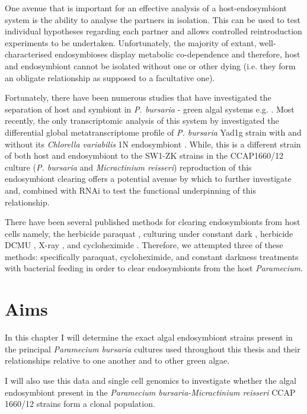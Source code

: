 One avenue that is important for an effective analysis of a host-endosymbiont
system is the ability to analyse the partners in isolation.  This can be used
to test individual hypotheses regarding each partner and  allows controlled
reintroduction experiments to be undertaken. 
Unfortunately,
the majority of extant, well-characterised endosymbioses display metabolic co-dependence
and therefore, host and endosymbiont cannot be isolated without one or other dying (i.e. they
form an obligate relationship as supposed to a facultative one). 

Fortunately, there have been numerous studies that have investigated the separation of 
host and symbiont in \textit{P. bursaria} - green algal systems e.g. \citep{Hosoya1995a,Achilles-Day2013,
Karakashian1963}. Most recently, the only transcriptomic analysis of this system by \citet{Kodama2014c}
investigated the differential global metatranscriptome profile of \textit{P. bursaria} Yad1g strain with 
 and without its \textit{Chlorella variabilis} 1N endosymbiont 
\citep{Kodama2014c}.   While, this is a different strain of both host and endosymbiont to the SW1-ZK 
strains in the CCAP1660/12 culture
(\textit{P. bursaria} and \textit{Micractinium reisseri}) reproduction of this endosymbiont
clearing offers a potential avenue by which to further investigate and, combined with RNAi 
to test the functional underpinning of this relationship. 

There have been several published methods
for clearing endosymbionts from host cells namely, the herbicide paraquat \citep{Hosoya1995a}, 
culturing under constant dark \citep{Karakashian1963}, herbicide DCMU \citep{Kodama2009a},
X-ray \citep{Wichterman1948}, and cycloheximide \citep{weis1984effect,Kodama2007}.
Therefore, we attempted three of these methods: specifically paraquat, cycloheximide, and 
constant darkness treatments with bacterial feeding 
in order to clear endosymbionts from the host \textit{Paramecium}.

\section{Aims}

In this chapter I will determine the exact algal endosymbiont strains present
in the principal \textit{Paramecium bursaria} cultures used throughout
this thesis and their relationships relative to one another and to
other green algae. 

I will also use this data and single cell genomics to investigate whether the algal
endosymbiont present in the \textit{Paramecium bursaria-Micractinium reisseri}
CCAP 1660/12 strains form a clonal population. 

